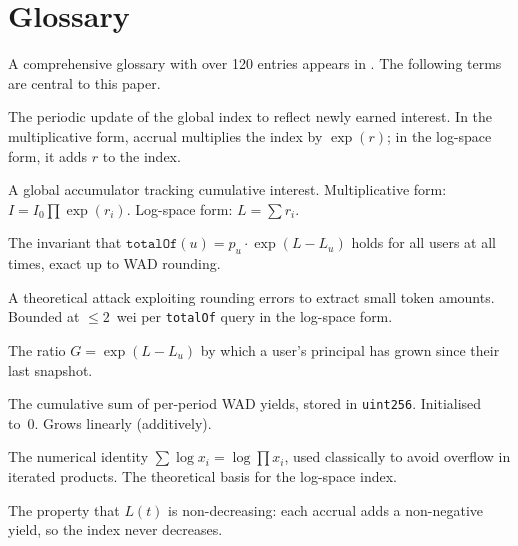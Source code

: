 \documentclass[10pt,a4paper,twocolumn]{article}
\begin{document}
\ifbundle\else
\section*{Glossary}

\noindent A comprehensive glossary with over 120 entries appears in \cite{ref}. The following terms are central to this paper.

\begin{description}[style=nextline, font=\normalfont\bfseries, leftmargin=1.5em]

\item[Accrual] The periodic update of the global index to reflect newly earned interest. In the multiplicative form, accrual multiplies the index by $\exp(r)$; in the log-space form, it adds $r$ to the index.

\item[Compounding Index] A global accumulator tracking cumulative interest. Multiplicative form: $I = I_0 \prod \exp(r_i)$. Log-space form: $L = \sum r_i$.

\item[Conservation] The invariant that $\texttt{totalOf}(u) = p_u \cdot \exp(L - L_u)$ holds for all users at all times, exact up to WAD rounding.

\item[Dust Extraction] A theoretical attack exploiting rounding errors to extract small token amounts. Bounded at $\leq 2$~wei per \texttt{totalOf} query in the log-space form.

\item[Growth Factor] The ratio $G = \exp(L - L_u)$ by which a user's principal has grown since their last snapshot.

\item[Log-Space Index ($L$)] The cumulative sum of per-period WAD yields, stored in \texttt{uint256}. Initialised to~0. Grows linearly (additively).

\item[Log-Sum-Exp] The numerical identity $\sum \log x_i = \log \prod x_i$, used classically to avoid overflow in iterated products. The theoretical basis for the log-space index.

\item[Monotonicity] The property that $L(t)$ is non-decreasing: each accrual adds a non-negative yield, so the index never decreases.


\end{description}
\end{document}
